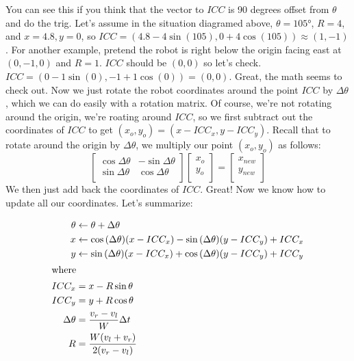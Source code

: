 \documentclass{article}
\begin{document}
You can see this if you think that the vector to $ICC$ is 90 degrees offset from $\theta$ and do the trig. Let's assume in the situation diagramed above, $\theta=\ang{105}$, $R=4$, and $x=4.8, y=0$, so $ICC = (4.8-4\sin{(105)}, 0+4\cos{(105)}) \approx (1, -1)$. For another example, pretend the robot is right below the origin facing east at $(0,-1,0)$ and $R=1$. $ICC$ should be $(0,0)$ so let's check. $ICC = (0-1\sin{(0)}, -1+1\cos{(0)}) = (0, 0).$ Great, the math seems to check out. Now we just rotate the robot coordinates around the point $ICC$ by $\Delta\theta$, which we can do easily with a rotation matrix. Of course, we're not rotating around the origin, we're roating around $ICC$, so we first subtract out the coordinates of $ICC$ to get $(x_o, y_o) = (x- ICC_x, y-ICC_y)$. Recall that to rotate around the origin by $\Delta\theta$, we multiply our point $(x_o, y_o)$ as follows:
\begin{equation}
  \begin{bmatrix}
    \cos{\Delta\theta} & -\sin{\Delta\theta} \\
    \sin{\Delta\theta} & \cos{\Delta\theta} \\
  \end{bmatrix}
  \begin{bmatrix}
    x_o \\
    y_o \\
  \end{bmatrix}
  =
  \begin{bmatrix}
    x_{new} \\
    y_{new} \\
  \end{bmatrix}
\end{equation}
We then just add back the coordinates of $ICC$. Great! Now we know how to update all our coordinates. Let's summarize:

\begin{align}
 \theta &\leftarrow \theta + \Delta\theta \\
  x &\leftarrow \cos{(\Delta\theta)}(x-ICC_x)-\sin{(\Delta\theta)}(y-ICC_y) + ICC_x \\
  y &\leftarrow \sin{(\Delta\theta)}(x-ICC_x)+\cos{(\Delta\theta)}(y-ICC_y) + ICC_y \\
\shortintertext{where}
  ICC_x &= x-R\sin{\theta} \\
  ICC_y &= y+R\cos{\theta} \\
  \Delta\theta &= \frac{v_r-v_l}{W}\Delta t \\
  R &= \frac{W(v_l+v_r)}{2(v_r-v_l)}
\end{align}
\end{document}
